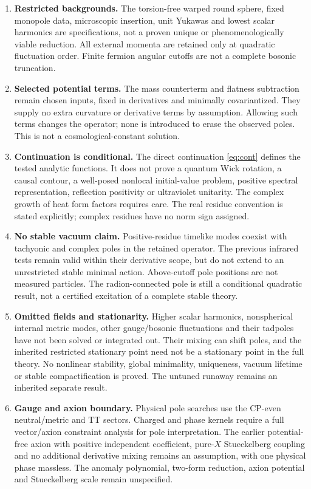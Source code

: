 \begin{enumerate}
\item \textbf{Restricted backgrounds.} The torsion-free warped round sphere, fixed monopole data, microscopic insertion, unit Yukawas and lowest scalar harmonics are specifications, not a proven unique or phenomenologically viable reduction. All external momenta are retained only at quadratic fluctuation order. Finite fermion angular cutoffs are not a complete bosonic truncation.
\item \textbf{Selected potential terms.} The mass counterterm and flatness subtraction remain chosen inputs, fixed in derivatives and minimally covariantized. They supply no extra curvature or derivative terms by assumption. Allowing such terms changes the operator; none is introduced to erase the observed poles. This is not a cosmological-constant solution.
\item \textbf{Continuation is conditional.} The direct continuation \eqref{eq:cont} defines the tested analytic functions. It does not prove a quantum Wick rotation, a causal contour, a well-posed nonlocal initial-value problem, positive spectral representation, reflection positivity or ultraviolet unitarity. The complex growth of heat form factors requires care. The real residue convention is stated explicitly; complex residues have no norm sign assigned.
\item \textbf{No stable vacuum claim.} Positive-residue timelike modes coexist with tachyonic and complex poles in the retained operator. The previous infrared tests remain valid within their derivative scope, but do not extend to an unrestricted stable minimal action. Above-cutoff pole positions are not measured particles. The radion-connected pole is still a conditional quadratic result, not a certified excitation of a complete stable theory.
\item \textbf{Omitted fields and stationarity.} Higher scalar harmonics, nonspherical internal metric modes, other gauge/bosonic fluctuations and their tadpoles have not been solved or integrated out. Their mixing can shift poles, and the inherited restricted stationary point need not be a stationary point in the full theory. No nonlinear stability, global minimality, uniqueness, vacuum lifetime or stable compactification is proved. The untuned runaway remains an inherited separate result.
\item \textbf{Gauge and axion boundary.} Physical pole searches use the CP-even neutral/metric and TT sectors. Charged and phase kernels require a full vector/axion constraint analysis for pole interpretation. The earlier potential-free axion with positive independent coefficient, pure-$X$ Stueckelberg coupling and no additional derivative mixing remains an assumption, with one physical phase massless. The anomaly polynomial, two-form reduction, axion potential and Stueckelberg scale remain unspecified.

\end{enumerate}
